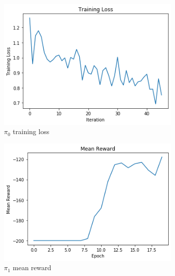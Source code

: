 \documentclass{article}
\begin{document}
\begin{figure}[h!]
\begin{subfigure}[b]{0.3\textwidth}
         	\label{fig:pi_0_reward}
     	\end{subfigure}
     	\hfill
     	\begin{subfigure}[b]{0.3\textwidth}
         	\centering
         	\includegraphics[width=\textwidth]
         	{images/training_loss_0}
         	\caption{$\pi_0$ training loss}
         	\label{fig:pi_0_reward}
     	\end{subfigure}
     	\centering
     	\begin{subfigure}[b]{0.3\textwidth}
         	\centering
         	\includegraphics[width=\textwidth]
         	{images/mean_reward_1}
         	\caption{$\pi_1$ mean reward}
         	\label{fig:pi_1_reward}
     	\end{subfigure}
     	\hfill
     	\begin{subfigure}[b]{0.3\textwidth}

\end{subfigure}
\end{figure}
\end{document}
